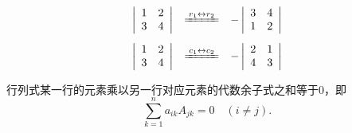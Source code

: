\begin{frame}
\begin{li}
  $$
  \begin{array}{rcl}
    \left|
    \begin{array}{ccc}
      1 & 2  \\
      3 & 4  \\
    \end{array}
    \right|        &\xlongequal[]{r_1\leftrightarrow r_2}&
                                                           -\left|
                                                           \begin{array}{ccc}
                                                             3 & 4 \\
                                                             1 & 2  
                                                           \end{array}
                                                                 \right|    \\[0.2in]
    \left|
    \begin{array}{ccc}
      1 & 2  \\
      3 & 4  
    \end{array}
          \right|
        &\xlongequal[]{c_1\leftrightarrow c_2}&
                                                -\left|
                                                \begin{array}{ccc}
                                                  2 & 1  \\
                                                  4 & 3  
                                                \end{array}
                                                      \right|    
  \end{array}
  $$    
\end{li}
%
\end{frame}

\begin{frame}
\begin{xingzhi}
  行列式某一行的元素乘以另一行对应元素的代数余子式之和等于$0$，即
  $$
  \sum_{k=1}^n a_{ik} A_{jk}  = 0 \quad (i\ne j).
  $$
\end{xingzhi} 
\end{frame}

